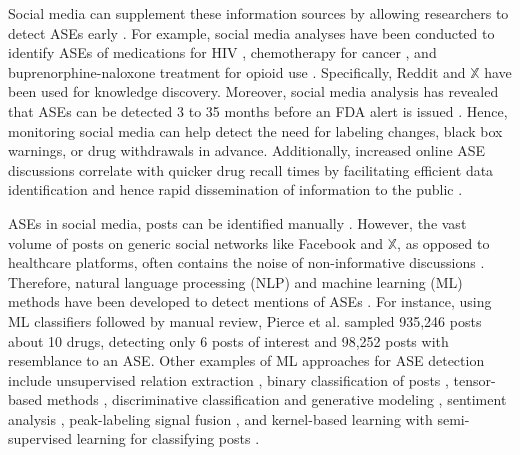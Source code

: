\documentclass[referee,bst/sn-basic]{sn-jnl}%
\theoremstyle{thmstyletwo}%
\theoremstyle{thmstylethree}%
\begin{document}
Social media can supplement these information sources by allowing researchers to detect ASEs early \cite{lee2021use}.
For example, social media analyses have been conducted to identify ASEs of medications for HIV \cite{loosier2021reddit}, chemotherapy for cancer \cite{zhang2018utilizing}, 
and buprenorphine-naloxone treatment for opioid use \cite{graves2022thematic}. 
Specifically, Reddit \cite{graves2022thematic, loosier2021reddit} and $\mathbb{X}$ \cite{zhang2018utilizing, hsu2017mining, jiang2013mining} have been used for knowledge discovery.
Moreover, social media analysis has revealed that ASEs can be detected 3 to 35 months before an FDA alert is issued \cite{adjeroh2014signal}. 
Hence, monitoring social media can help detect the need for labeling changes, black box warnings, or drug withdrawals \cite{lee2021use} in advance. 
Additionally, increased online ASE discussions correlate with quicker drug recall times by facilitating efficient data identification and hence rapid dissemination of information to the public \cite{gao2022does}.

ASEs in social media, posts can be identified manually \cite{convertino2018usefulness}.
However, the vast volume of posts on generic social networks like Facebook and $\mathbb{X}$, as opposed to healthcare platforms, often contains the noise of non-informative discussions \cite{pappa2019harnessing}.
Therefore, natural language processing (NLP) and machine learning (ML) methods have been developed to detect mentions of ASEs \cite{golder2023role}.
For instance, using ML classifiers followed by manual review, Pierce et al. \cite{pierce2017evaluation} sampled 935,246 posts about 10 drugs, detecting only 6 posts of interest and 98,252 posts with resemblance to an ASE.
Other examples of ML approaches for ASE detection include unsupervised relation extraction \cite{feldman2015utilizing}, binary classification of posts \cite{patki2014mining}, tensor-based methods \cite{yang2015exploiting}, discriminative classification and generative modeling \cite{wu2013exploiting}, sentiment analysis \cite{moh2017adverse}, peak-labeling signal fusion \cite{adjeroh2014signal}, and kernel-based learning with semi-supervised learning for classifying posts \cite{liu2013azdrugminer}.

\end{document}
